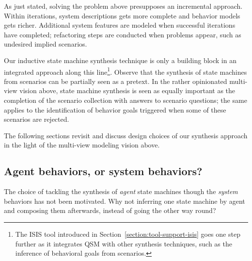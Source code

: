 As just stated, solving the problem above presupposes an incremental approach. Within iterations, system descriptions gets more complete and behavior models gets richer. Additional system features are modeled when successful iterations have completed; refactoring steps are conducted when problems appear, such as undesired implied scenarios.

Our inductive state machine synthesis technique is only a building block in an integrated approach along this line\footnote{The ISIS tool introduced in Section~\ref{section:tool-support-isis} goes one step further as it integrates QSM with other synthesis techniques, such as the inference of behavioral goals from scenarios.}. Observe that the synthesis of state machines from scenarios can be partially seen as a pretext. In the rather opinionated multi-view vision above, state machine synthesis is seen as equally important as the completion of the scenario collection with answers to scenario questions; the same applies to the identification of behavior goals triggered when some of these scenarios are rejected.

The following sections revisit and discuss design choices of our synthesis approach in the light of the multi-view modeling vision above.

\subsection{Agent behaviors, or system behaviors?}

The choice of tackling the synthesis of \emph{agent} state machines though the \emph{system} behaviors has not been motivated. Why not inferring one state machine by agent and composing them afterwards, instead of going the other way round?

